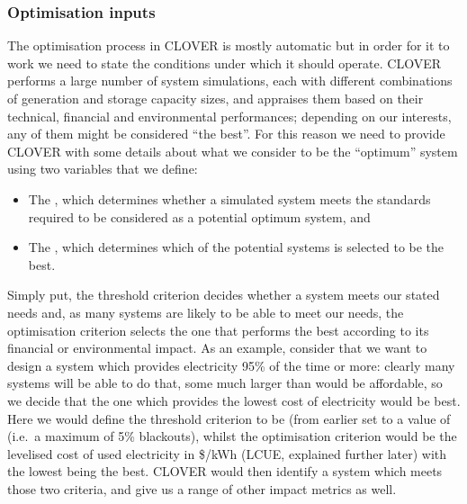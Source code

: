 \documentclass[letterpaper,10pt,english]{sphinxmanual}
\begin{document}
\subsubsection{Optimisation inputs}
\label{\detokenize{optimisation:optimisation-inputs}}
\sphinxAtStartPar
The optimisation process in CLOVER is mostly automatic but in order for
it to work we need to state the conditions under which it should
operate. CLOVER performs a large number of system simulations, each with
different combinations of generation and storage capacity sizes, and
appraises them based on their technical, financial and environmental
performances; depending on our interests, any of them might be
considered “the best”. For this reason we need to provide CLOVER with
some details about what we consider to be the “optimum” system using two
variables that we define:
\begin{itemize}
\item {} 
\sphinxAtStartPar
The , which determines whether a simulated system meets the standards required to be considered as a potential optimum system, and

\item {} 
\sphinxAtStartPar
The , which determines which of the potential systems is selected to be the best.

\end{itemize}

\sphinxAtStartPar
Simply put, the threshold criterion decides whether a system meets our
stated needs and, as many systems are likely to be able to meet our
needs, the optimisation criterion selects the one that performs the best
according to its financial or environmental impact. As an example,
consider that we want to design a system which provides electricity 95\%
of the time or more: clearly many systems will be able to do that, some
much larger than would be affordable, so we decide that the one which
provides the lowest cost of electricity would be best. Here we would
define the threshold criterion to be  (from
earlier set to a value of  (i.e. a
maximum of 5\% blackouts), whilst the optimisation criterion would be the
levelised cost of used electricity in \$/kWh (LCUE, explained further
later) with the lowest being the best. CLOVER would then identify a
system which meets those two criteria, and give us a range of other
impact metrics as well.
\end{document}
